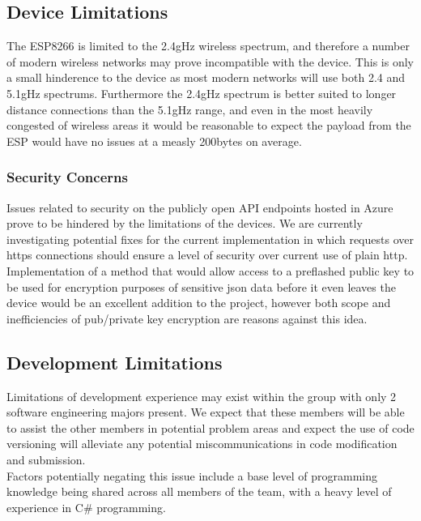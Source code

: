 \documentclass{article}
\begin{document}
        \subsection{Device Limitations}
            The ESP8266 is limited to the 2.4gHz wireless spectrum, and therefore a number of modern wireless
            networks may prove incompatible with the device. This is only a small hinderence to the device as
            most modern networks will use both 2.4 and 5.1gHz spectrums. Furthermore the 2.4gHz spectrum is 
            better suited to longer distance connections than the 5.1gHz range, and even in the most
            heavily congested of wireless areas it would be reasonable to expect the payload from the ESP would
            have no issues at a measly 200bytes on average.
            
            \subsubsection{Security Concerns}
            Issues related to security on the publicly open API endpoints hosted in Azure prove to be hindered
            by the limitations of the devices. We are currently investigating potential fixes for the current
            implementation in which requests over https connections should ensure a level of security over 
            current use of plain http.
            \\
            Implementation of a method that would allow access to a preflashed public key to be used for encryption
            purposes of sensitive json data before it even leaves the device would be an excellent addition to 
            the project, however both scope and inefficiencies of pub/private key encryption are reasons against
            this idea.
        
        \subsection{Development Limitations}
            Limitations of development experience may exist within the group with only 2 software engineering majors
            present. We expect that these members will be able to assist the other members in potential problem 
            areas and expect the use of code versioning will alleviate any potential miscommunications in code 
            modification and submission.
            \\
            Factors potentially negating this issue include a base level of programming knowledge being shared across
            all members of the team, with a heavy level of experience in C\# programming.
\end{document}
